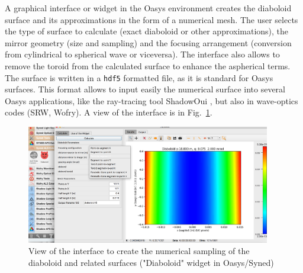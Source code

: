 \documentclass{iucr}              %
\newcommand{\inred}[1]{{\color{red}#1}}
\begin{document}

A graphical interface or widget in the Oasys environment  creates the diaboloid surface and its approximations in the form of a numerical mesh. The user selects the type of surface to calculate (exact diaboloid or other approximations), the mirror geometry (size and sampling) and the focusing arrangement (conversion from cylindrical to spherical wave or viceversa). The interface also allows to remove the toroid from the calculated surface to enhance the aspherical terms. The surface is written in a {\tt hdf5} formatted file, as it is standard for Oasys surfaces. This format allows to input easily the numerical surface into several Oasys applications, like the ray-tracing tool ShadowOui \cite{codeSHADOWOUI}, but also in wave-optics codes (SRW, Wofry). A view of the interface is in Fig.~\ref{fig:widget}.

\begin{figure}\label{fig:widget}
\centering
\includegraphics[width=0.95\textwidth]{figures/widget.png}
\caption{View of the interface to create the numerical sampling of the diaboloid and related surfaces ("Diaboloid" widget in Oasys/Syned) }
\end{figure}
\end{document}
